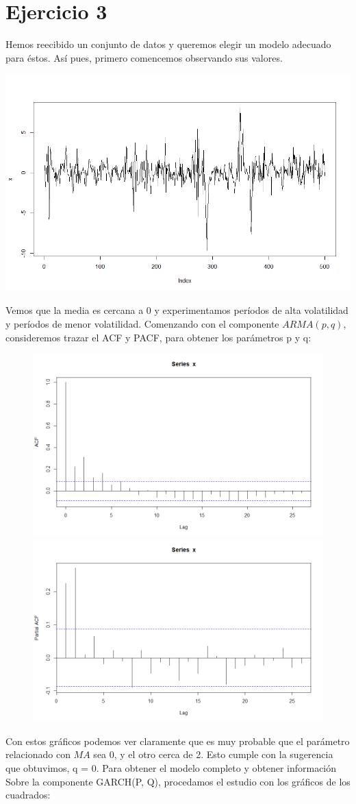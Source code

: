 \documentclass[a4paper,]{article}
\begin{document}
\section*{Ejercicio 3}
Hemos reecibido un conjunto de datos y queremos elegir un modelo adecuado para éstos. Así pues, primero comencemos observando sus valores.
\begin{center}
    \includegraphics[width=0.7\linewidth]{DataHW2.png}
\end{center}

Vemos que la media es cercana a $0$ y experimentamos períodos de alta volatilidad y períodos de menor volatilidad.
Comenzando con el componente $ARMA(p, q)$, consideremos trazar el ACF y PACF, para obtener los parámetros p y q:

\begin{figure}[H]
    \centering \includegraphics[width=0.49\linewidth]{ACF-HW2.png}
    \includegraphics[width=0.49\linewidth]{PACF-HW2.png}
\end{figure}

Con estos gráficos podemos ver claramente que es muy probable que el parámetro relacionado con $MA$ sea 0, y el
otro cerca de 2. Esto cumple con la sugerencia que obtuvimos, q = 0. Para obtener el modelo completo y obtener información
Sobre la componente GARCH(P, Q), procedamos el estudio con los gráficos de los cuadrados:
\end{document}
